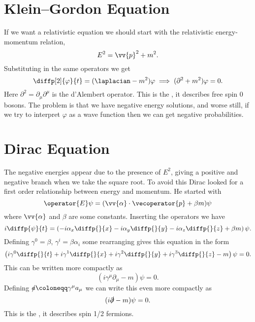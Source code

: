 \documentclass[fleqn]{NotesClass}
\newcommand{\dalembertian}{\partial^2}
\begin{document}
    \section{Klein--Gordon Equation}
    If we want a relativistic equation we should start with the relativistic energy-momentum relation,
    \begin{equation}
        E^2 = \vv{p}^2 + m^2.
    \end{equation}
    Substituting in the same operators we get
    \begin{equation}
        \diffp[2]{\varphi}{t} = (\laplacian - m^2)\varphi \implies (\dalembertian + m^2)\varphi = 0.
    \end{equation}
    Here \(\dalembertian = \partial_\mu \partial^\mu\) is the d'Alembert operator.
    This is the , it describes free spin 0 bosons.
    The problem is that we have negative energy solutions, and worse still, if we try to interpret \(\varphi\) as a wave function then we can get negative probabilities.
    
    \section{Dirac Equation}
    The negative energies appear due to the presence of \(E^2\), giving a positive and negative branch when we take the square root.
    To avoid this Dirac looked for a first order relationship between energy and momentum.
    He started with
    \begin{equation}
        \operator{E}\psi = (\vv{\alpha} \cdot \vecoperator{p} + \beta m)\psi
    \end{equation}
    where \(\vv{\alpha}\) and \(\beta\) are some constants.
    Inserting the operators we have
    \begin{equation}
        i\diffp{\psi}{t} = \left( -i\alpha_x \diffp{}{x} - i\alpha_y \diffp{}{y} - i\alpha_z \diffp{}{z} + \beta m \right)\psi.
    \end{equation}
    Defining \(\gamma^0 = \beta\), \(\gamma^i = \beta \alpha_i\) some rearranging gives this equation in the form
    \begin{equation}
        \left( i\gamma^0 \diffp{}{t} + i\gamma^1 \diffp{}{x} + i\gamma^2 \diffp{}{y} + i\gamma^3 \diffp{}{z} - m \right) \psi = 0.
    \end{equation}
    This can be written more compactly as
    \begin{equation}
        (i\gamma^\mu \partial_\mu - m)\psi = 0.
    \end{equation}
    Defining \(\slashed{a} \coloneqq \gamma^\mu a_\mu\) we can write this even more compactly as
    \begin{equation}
        (i\slashed{\partial} - m)\psi = 0.
    \end{equation}
    This is the , it describes spin 1/2 fermions.
    
\end{document}
